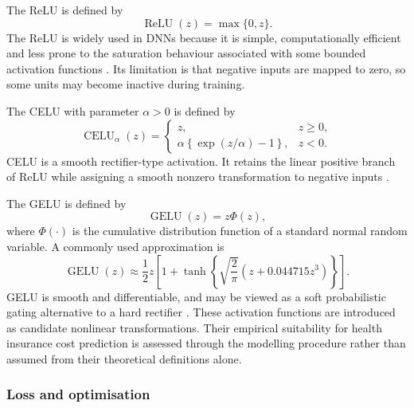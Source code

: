 \noindent
The ReLU is defined by
\begin{equation}
\label{eq:relu}
    \operatorname{ReLU}(z)
    =
    \max\{0,z\}.
\end{equation}
The ReLU is widely used in DNNs because it is
simple, computationally efficient and less prone to the saturation behaviour
associated with some bounded activation functions
\citep{nair2010rectified,goodfellow2016deep}. Its limitation is that negative
inputs are mapped to zero, so some units may become inactive during training.

\noindent
The CELU with parameter
\(\alpha>0\) is defined by
\begin{equation}
\label{eq:celu}
    \operatorname{CELU}_{\alpha}(z)
    =
    \begin{cases}
        z, & z\geq 0,\\[4pt]
        \alpha\left\{\exp(z/\alpha)-1\right\}, & z<0.
    \end{cases}
\end{equation}
CELU is a smooth rectifier-type activation. It retains the linear positive
branch of ReLU while assigning a smooth nonzero transformation to negative
inputs \citep{barron2017celu}.

\noindent
The GELU is defined by
\begin{equation}
\label{eq:gelu}
    \operatorname{GELU}(z)
    =
    z\Phi(z),
\end{equation}
where \(\Phi(\cdot)\) is the cumulative distribution function of a standard
normal random variable. A commonly used approximation is
\[
    \operatorname{GELU}(z)
    \approx
    \frac{1}{2}z
    \left[
        1+
        \tanh
        \left\{
            \sqrt{\frac{2}{\pi}}
            \left(
                z+0.044715z^{3}
            \right)
        \right\}
    \right].
\]
GELU is smooth and differentiable, and may be viewed as a soft probabilistic
gating alternative to a hard rectifier \citep{hendrycks2016gelu,lee2023gelu}.
These activation functions are introduced as candidate nonlinear
transformations. Their empirical suitability for health insurance cost
prediction is assessed through the modelling procedure rather than assumed from
their theoretical definitions alone.

\subsubsection{Loss and optimisation}
\label{sec:loss_optimisation}

